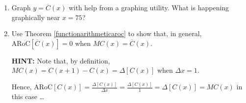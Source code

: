 \documentclass{ximera}
\begin{document}
\begin{enumerate}
\begin{enumerate}
\item Graph $y = \overline{C}(x)$ with help from a graphing utility.  What is happening graphically near $x = 75$?

\item  Use Theorem \ref{functionarithmeticaroc} to show that, in general, $\text{ARoC}[ \overline{C}(x)] = 0$ when $MC(x) = \overline{C}(x)$.

\smallskip

\textbf{HINT:}  Note that, by definition, $MC(x) = C(x+1) - C(x) = \Delta[C(x)]$ when $\Delta x = 1$.  

\smallskip

Hence,  $\text{ARoC}[C(x)] = \frac{\Delta[C(x)]}{\Delta x} = \frac{\Delta[C(x)]}{1} = \Delta[C(x)] = MC(x)$ in this case \ldots 

\end{enumerate}

\setcounter{HW}{\value{enumi}}

\end{enumerate}


\newpage
\end{document}
